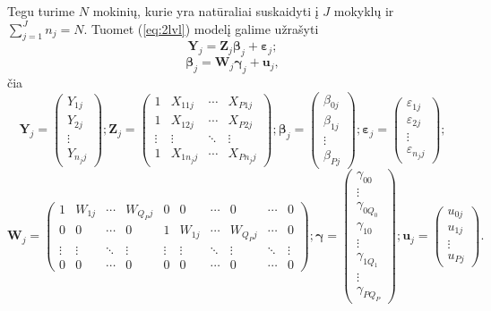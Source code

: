 \documentclass[12pt,a4paper]{article}
\begin{document}
Tegu turime $N$ mokinių, kurie yra natūraliai suskaidyti į $J$ mokyklų ir $\sum^J_{j=1} n_j = N$. Tuomet (\ref{eq:2lvl}) modelį galime užrašyti
\begin{equation}
\mathbf{Y}_j=\mathbf{Z}_j\boldsymbol{\beta}_j+\boldsymbol{\varepsilon}_j;
\end{equation}
\begin{equation}
\boldsymbol{\beta}_{j}=\mathbf{W}_{j}\boldsymbol{\gamma}_{j}+\mathbf{u}_{j},
\end{equation}
čia
\[
\mathbf{Y}_{j} =
\begin{pmatrix}
Y_{1j} \\
Y_{2j} \\
\vdots \\
Y_{n_jj}
\end{pmatrix};
\mathbf{Z}_{j} =
\begin{pmatrix}
1 & X_{11j} & \cdots & X_{P1j} \\
1 & X_{12j} & \cdots & X_{P2j} \\
\vdots & \vdots & \ddots & \vdots \\
1 & X_{1n_jj} & \cdots & X_{Pn_jj}
\end{pmatrix};
\boldsymbol{\beta}_{j} =
\begin{pmatrix}
\beta_{0j} \\
\beta_{1j} \\
\vdots \\
\beta_{Pj}
\end{pmatrix};
\boldsymbol{\varepsilon}_{j} =
\begin{pmatrix}
\varepsilon_{1j} \\
\varepsilon_{2j} \\
\vdots \\
\varepsilon_{n_jj}
\end{pmatrix};
\]
\[
\mathbf{W}_{j} =
\begin{pmatrix}
1& W_{1j} & \cdots & W_{Q_Pj} & 0 & 0 & \cdots & 0 & \cdots & 0\\
0 &0 & \cdots & 0 &1 & W_{1j} & \cdots & W_{Q_Pj} & \cdots &0\\
\vdots & \vdots & \ddots & \vdots & \vdots & \vdots & \ddots & \vdots & \ddots & \vdots\\
0 &0 & \cdots & 0 & 0& 0&\cdots & 0& \cdots & 0
\end{pmatrix};
\boldsymbol{\gamma}=
\begin{pmatrix}
\gamma_{00} \\
\vdots\\
\gamma_{0Q_0} \\
\gamma_{10}\\
\vdots\\
\gamma_{1Q_1} \\
\vdots \\
\gamma_{PQ_P}
\end{pmatrix};
\mathbf{u}_{j} =
\begin{pmatrix}
u_{0j} \\
u_{1j} \\
\vdots \\
u_{Pj}
\end{pmatrix}.
\]
\end{document}
